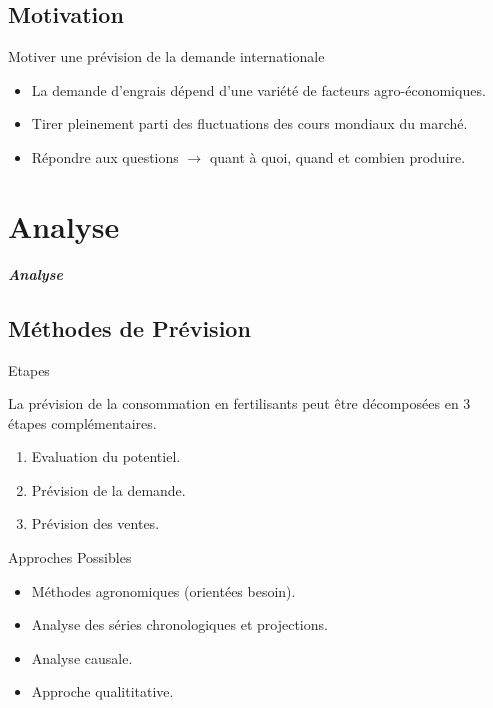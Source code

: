 \documentclass[handout]{beamer}
\begin{document}
\subsection{Motivation}
\begin{frame}
  \begin{block}{Motiver une prévision de la demande internationale}
    \begin{itemize}
    \item La demande d'engrais dépend d'une variété de facteurs agro-économiques.
    \item Tirer pleinement parti des fluctuations des cours mondiaux du marché. %
    \item  Répondre aux questions $\rightarrow$ quant à quoi, quand et combien produire.
    \end{itemize}
    \end{block}
\end{frame}

\section{Analyse}

\begin{frame}
	\begin{center}
		\Huge \textbf{\textit{Analyse}}
	\end{center}
\end{frame}

\subsection{Méthodes de Prévision}
\begin{frame}
  \begin{block}{Etapes}
  \small{La prévision de la consommation en fertilisants peut être décomposées en 3 étapes complémentaires.
  \begin{enumerate}
  \item Evaluation du potentiel.
  \item Prévision de la demande.
  \item Prévision des ventes.
  \end{enumerate}
  }\end{block}
\end{frame}

\begin{frame}
	\begin{block}{Approches Possibles}
	\small{
	\begin{itemize}
	\item Méthodes agronomiques (orientées besoin).
	\item Analyse des séries chronologiques et projections.
	\item Analyse causale.
	\item Approche qualititative.
	\end{itemize}
	}
	\end{block}
\end{frame}
\end{document}
